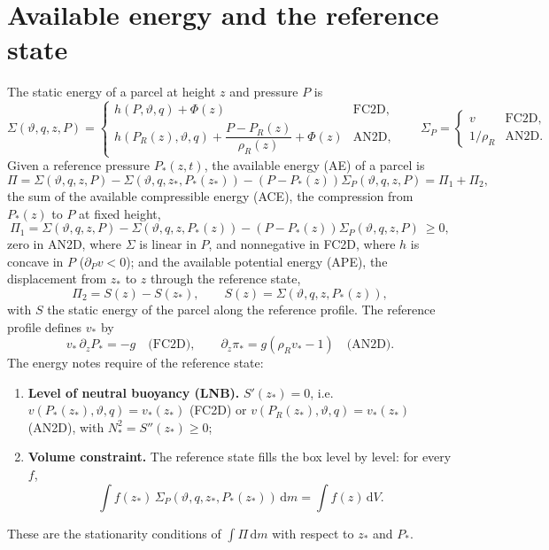 \documentclass[11pt,a4paper]{article}
\newcommand{\vt}{\vartheta}
\newcommand{\zs}{z_{*}}
\begin{document}
\section{Available energy and the reference state}\label{sec:theory}
The static energy of a parcel at height $z$ and pressure $P$ is
\begin{equation}
  \Sigma(\vt,q,z,P)=\begin{cases}
    h(P,\vt,q)+\Phi(z) & \text{FC2D},\\[2pt]
    h(P_R(z),\vt,q)+\dfrac{P-P_R(z)}{\rho_R(z)}+\Phi(z) & \text{AN2D},
  \end{cases}
  \qquad \Sigma_P=\begin{cases}v & \text{FC2D},\\ 1/\rho_R & \text{AN2D}.\end{cases}
  \label{eq:Sigma}
\end{equation}
Given a reference pressure $P_*(z,t)$, the available energy (AE) of a parcel is
\begin{equation}
  \Pi=\Sigma(\vt,q,z,P)-\Sigma\left(\vt,q,\zs,P_*(\zs)\right)-\left(P-P_*(z)\right)\Sigma_P(\vt,q,z,P)=\Pi_1+\Pi_2,
  \label{eq:A}
\end{equation}
the sum of the available compressible energy (ACE), the compression from $P_*(z)$ to $P$ at fixed height,
\begin{equation}
  \Pi_1=\Sigma(\vt,q,z,P)-\Sigma(\vt,q,z,P_*(z))-\left(P-P_*(z)\right)\Sigma_P(\vt,q,z,P)\ \ge0,
\end{equation}
zero in AN2D, where $\Sigma$ is linear in $P$, and nonnegative in FC2D, where $h$ is concave in $P$ ($\partial_Pv<0$); and the
available potential energy (APE), the displacement from $\zs$ to $z$ through the reference state,
\begin{equation}
  \Pi_2=S(z)-S(\zs),\qquad S(z)=\Sigma\left(\vt,q,z,P_*(z)\right),
  \label{eq:Pi2}
\end{equation}
with $S$ the static energy of the parcel along the reference profile. The reference profile defines $v_*$ by
\begin{equation}
  v_*\,\partial_zP_*=-g\quad\text{(FC2D)},\qquad \partial_z\pi_*=g\left(\rho_Rv_*-1\right)\quad\text{(AN2D)}.
  \label{eq:vstar}
\end{equation}
The energy notes require of the reference state:
\begin{enumerate}
  \item \textbf{Level of neutral buoyancy (LNB).} $S'(\zs)=0$, i.e.\ $v(P_*(\zs),\vt,q)=v_*(\zs)$ (FC2D) or
        $v(P_R(\zs),\vt,q)=v_*(\zs)$ (AN2D), with $N_*^2=S''(\zs)\ge0$;
  \item \textbf{Volume constraint.} The reference state fills the box level by level: for every $f$,
        \begin{equation*}
          \int f(\zs)\,\Sigma_P(\vt,q,\zs,P_*(\zs))\,\mathrm{d}m=\int f(z)\,\mathrm{d}V .
        \end{equation*}
\end{enumerate}
These are the stationarity conditions of $\int\Pi\,\mathrm{d}m$ with respect to $\zs$ and $P_*$.
\end{document}
